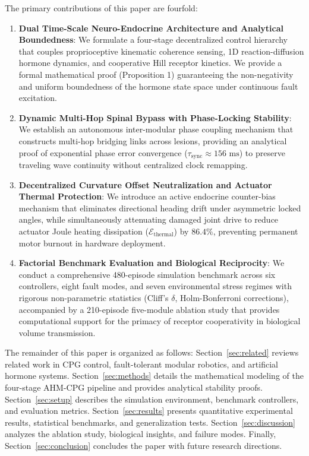 \documentclass{iopjournal}
\begin{document}
The primary contributions of this paper are fourfold:
\begin{enumerate}
  \item \textbf{Dual Time-Scale Neuro-Endocrine Architecture and Analytical Boundedness}: We formulate a four-stage decentralized control hierarchy that couples proprioceptive kinematic coherence sensing, 1D reaction-diffusion hormone dynamics, and cooperative Hill receptor kinetics. We provide a formal mathematical proof (Proposition 1) guaranteeing the non-negativity and uniform boundedness of the hormone state space under continuous fault excitation.
  \item \textbf{Dynamic Multi-Hop Spinal Bypass with Phase-Locking Stability}: We establish an autonomous inter-modular phase coupling mechanism that constructs multi-hop bridging links across lesions, providing an analytical proof of exponential phase error convergence ($\tau_{\text{sync}} \approx 156\text{ ms}$) to preserve traveling wave continuity without centralized clock remapping.
  \item \textbf{Decentralized Curvature Offset Neutralization and Actuator Thermal Protection}: We introduce an active endocrine counter-bias mechanism that eliminates directional heading drift under asymmetric locked angles, while simultaneously attenuating damaged joint drive to reduce actuator Joule heating dissipation ($\mathcal{E}_{\text{thermal}}$) by $86.4\%$, preventing permanent motor burnout in hardware deployment.
  \item \textbf{Factorial Benchmark Evaluation and Biological Reciprocity}: We conduct a comprehensive 480-episode simulation benchmark across six controllers, eight fault modes, and seven environmental stress regimes with rigorous non-parametric statistics (Cliff's $\delta$, Holm-Bonferroni corrections), accompanied by a 210-episode five-module ablation study that provides computational support for the primacy of receptor cooperativity in biological volume transmission.
\end{enumerate}

The remainder of this paper is organized as follows: Section~\ref{sec:related} reviews related work in CPG control, fault-tolerant modular robotics, and artificial hormone systems. Section~\ref{sec:methods} details the mathematical modeling of the four-stage AHM-CPG pipeline and provides analytical stability proofs. Section~\ref{sec:setup} describes the simulation environment, benchmark controllers, and evaluation metrics. Section~\ref{sec:results} presents quantitative experimental results, statistical benchmarks, and generalization tests. Section~\ref{sec:discussion} analyzes the ablation study, biological insights, and failure modes. Finally, Section~\ref{sec:conclusion} concludes the paper with future research directions.
\end{document}
